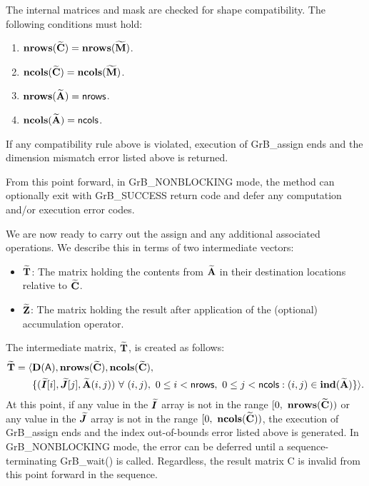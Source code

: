 The internal matrices and mask are checked for shape compatibility. The following 
conditions must hold:
\begin{enumerate}
    \item $\bold{nrows}({\bf \widetilde{C}}) = \bold{nrows}({\bf \widetilde{M}})$.

    \item $\bold{ncols}({\bf \widetilde{C}}) = \bold{ncols}({\bf \widetilde{M}})$.

    \item $\bold{nrows}({\bf \widetilde{A}}) = {\sf nrows}$.

    \item $\bold{ncols}({\bf \widetilde{A}}) = {\sf ncols}$.
\end{enumerate}
If any compatibility rule above is violated, execution of {\sf GrB\_assign} ends and 
the dimension mismatch error listed above is returned.

From this point forward, in {\sf GrB\_NONBLOCKING} mode, the method can 
optionally exit with {\sf GrB\_SUCCESS} return code and defer any computation 
and/or execution error codes.

We are now ready to carry out the assign and any additional 
associated operations.  We describe this in terms of two intermediate vectors:
\begin{itemize}
	\item ${\bf \widetilde{T}}$: The matrix holding the contents from
    ${\bf \widetilde{A}}$ in their destination locations relative to
    ${\bf \widetilde{C}}$.

	\item ${\bf \widetilde{Z}}$: The matrix holding the result after 
    application of the (optional) accumulation operator.
\end{itemize}

The intermediate matrix, ${\bf \widetilde{T}}$, is created as follows:
\[ 
\begin{aligned}
{\bf \widetilde{T}} = \langle & \bold{D}({\sf A}), 
                           \bold{nrows}({\bf \widetilde{C}}), 
                           \bold{ncols}({\bf \widetilde{C}}), \\
 & \{ (\bm{\widetilde{I}}[i],\bm{\widetilde{J}}[j],{\bf \widetilde{A}}(i,j)) 
\ \forall \ (i,j), \ 0 \leq i < {\sf nrows}, \ 0 \leq j < {\sf ncols} :
(i,j) \in \bold{ind}({\bf \widetilde{A}}) \} \rangle. 
\end{aligned}
\]
At this point, if any value in the $\bm{\widetilde{I}}$ array is not in
the range $[0,\ \bold{nrows}(\matrix{\widetilde{C}}) )$ or any value in the 
$\bm{\widetilde{J}}$ array is not in the range 
$[0,\ \bold{ncols}(\matrix{\widetilde{C}}))$, the execution of {\sf GrB\_assign} 
ends and the index out-of-bounds error listed above is generated.  In 
{\sf GrB\_NONBLOCKING} mode, the error can be deferred until a 
sequence-terminating {\sf GrB\_wait()} is called.  Regardless, the result 
matrix {\sf C} is invalid from this point forward in the sequence.

